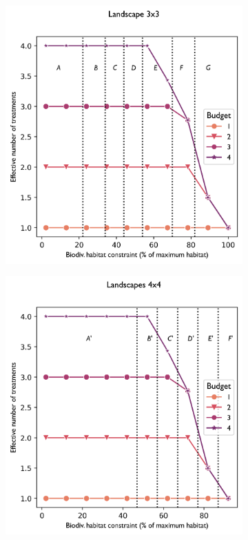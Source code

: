 \newpage


\begin{figure}[H]
     \centering
     \begin{subfigure}[b]{0.48\textwidth}
         \centering
         \includegraphics[width=\textwidth]{figures/wildland/number_treatments3.png}
         \caption{}
         \label{fig:treatments_number3}
     \end{subfigure}
    \begin{subfigure}[b]{0.48\textwidth}
         \centering
         \includegraphics[width=\textwidth]{figures/wildland/number_treatments4.png}

\end{subfigure}
\end{figure}
